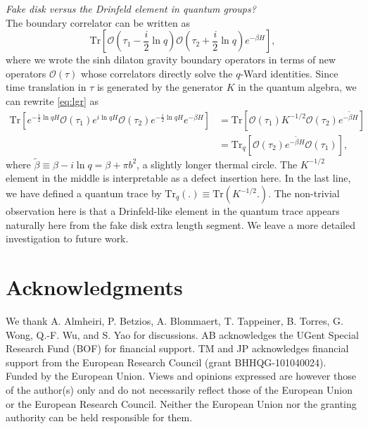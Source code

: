 \documentclass[a4paper,titlepage,12pt]{article}
\numberwithin{equation}{section}
\begin{document}
\textit{Fake disk versus the Drinfeld element in quantum groups?} \\
The boundary correlator can be written as
\begin{equation}
\label{eq:lgr}
\text{Tr} \left[\mathcal{O}\left(\tau_1-\frac{i}{2}\ln q\right)\mathcal{O}\left(\tau_2+\frac{i}{2}\ln q\right)e^{-\beta H}\right],
\end{equation}
where we wrote the sinh dilaton gravity boundary operators in terms of new operators $\mathcal{O}(\tau)$ whose correlators directly solve the $q$-Ward identities. Since time translation in $\tau$ is generated by the generator $K$ in the quantum algebra, we can rewrite \eqref{eq:lgr} as
\begin{align}
\text{Tr} \left[e^{-\frac{i}{2}\ln q H}\mathcal{O}(\tau_1)e^{i\ln q H}\mathcal{O}(\tau_2)e^{-\frac{i}{2}\ln q H}e^{-\beta H}\right]
&= \text{Tr} \left[\mathcal{O}(\tau_1)K^{-1/2}\mathcal{O}(\tau_2)e^{-\tilde{\beta} H}\right] \\
&= \text{Tr}_q \left[\mathcal{O}(\tau_2)e^{-\tilde{\beta} H}\mathcal{O}(\tau_1)\right],
\end{align}
where $\tilde{\beta} \equiv \beta - i\ln q = \beta +\pi b^2$, a slightly longer thermal circle.
The $K^{-1/2}$ element in the middle is interpretable as a defect insertion here. In the last line, we have defined a quantum trace by $\text{Tr}_q(.) \equiv \text{Tr}(K^{-1/2}.)$. The non-trivial observation here is that a Drinfeld-like element in the quantum trace appears naturally here from the fake disk extra length segment. We leave a more detailed investigation to future work.


\section*{Acknowledgments}
We thank A. Almheiri, P. Betzios, A. Blommaert, T. Tappeiner, B. Torres, G. Wong, Q.-F. Wu, and S. Yao for discussions. AB acknowledges the UGent Special Research Fund (BOF) for financial support. TM and JP acknowledges financial support from the European Research Council (grant BHHQG-101040024). Funded by the European Union. Views and opinions expressed are however those of the author(s) only and do not necessarily reflect those of the European Union or the European Research Council. Neither the European Union nor the granting authority can be held responsible for them.

\appendix
\end{document}
